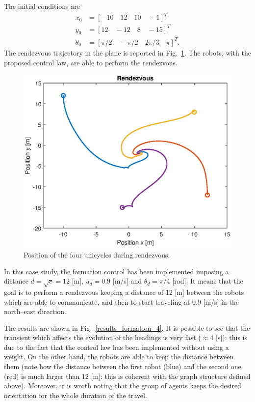 \documentclass[11pt]{article}
\begin{document}
The initial conditions are 
\[
\begin{split}
x_0 & = [-10 \quad 12 \quad 10 \quad -1]^T \\
y_0 & = [12 \quad -12 \quad 8 \quad -15]^T \\ 
\theta_0 & = [\pi/2 \quad -\pi/2 \quad 2\pi/3 \quad \pi]^T.
\end{split}
\]
The rendezvous trajectory in the plane is reported in Fig.~\ref{pos_rendez_4}. The robots, with the proposed control law, are able to perform the rendezvous.

\begin{figure}[H]
\centering
\includegraphics[width=.6\textwidth]{Images/4agents/Position_Rendezvous}
\caption{Position of the four unicycles during rendezvous.}
\label{pos_rendez_4}
\end{figure}

In this case study, the formation control has been implemented imposing a distance $d = \sqrt{c} = 12$ [m], $u_d = 0.9$ [m/s] and $\theta_d = \pi/4$ [rad]. It means that the goal is to perform a rendezvous keeping a distance of 12 [m] between the robots which are able to communicate, and then to start traveling at 0.9 [m/s] in the north--east direction.

The results are shown in Fig.~\ref{results_formation_4}. It is possible to see that the transient which affects the evolution of the headings is very fast ($\approx 4$ [s]): this is due to the fact that the control law has been implemented without using a weight. On the other hand, the robots are able to keep the distance between them (note how the distance between the first robot (blue) and the second one (red) is much larger than 12 [m]: this is coherent with the graph structure defined above). Moreover, it is worth noting that the group of agents keeps the desired orientation for the whole duration of the travel. 
\end{document}
